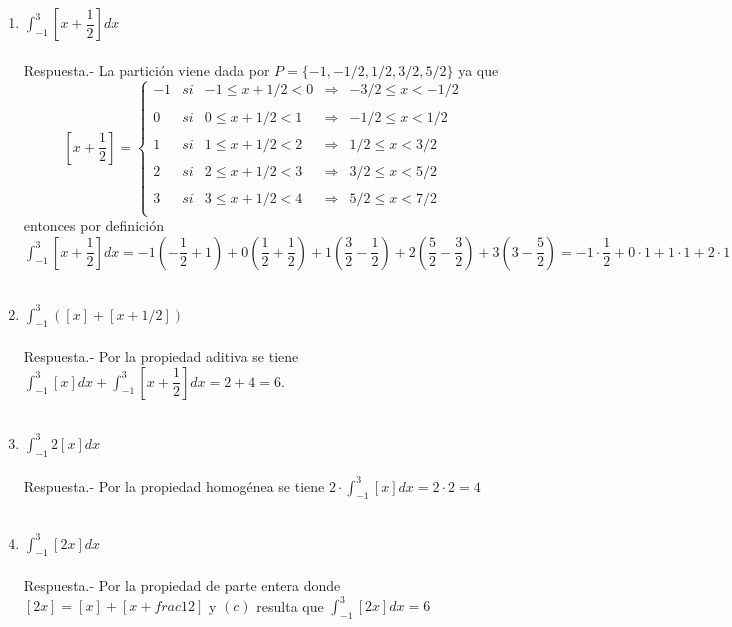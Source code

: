\begin{enumerate}
\begin{enumerate}[\bfseries (a)]
	\item $\displaystyle\int_{-1}^{3} \left[ x + \dfrac{1}{2} \right] dx$\\\\
	    Respuesta.-\; La partición viene dada por $P=\lbrace -1,-1/2,1/2,3/2,5/2\rbrace$ ya que 
	    $$\left[x + \dfrac{1}{2} \right] = \left\{ \begin{array}{rclcl}
		-1&si&-1\leq x + 1/2 < 0&\Longrightarrow&-3/2 \leq x < -1/2\\
		\\ 0&si&0\leq x + 1/2 < 1&\Longrightarrow&-1/2 \leq x < 1/2\\
		\\ 1&si&1\leq x + 1/2 < 2&\Longrightarrow&1/2 \leq x < 3/2\\
		\\ 2&si&2 \leq x + 1/2 < 3&\Longrightarrow&3/2 \leq x < 5/2\\
		\\ 3&si &3 \leq x + 1/2 < 4&\Longrightarrow&5/2 \leq x < 7/2 \\
	    \end{array}\right.$$
	     entonces por definición $\displaystyle\int_{-1}^{3} \left[x + \dfrac{1}{2}\right] dx = -1\left(-\dfrac{1}{2} + 1\right) + 0 \left( \dfrac{1}{2} + \dfrac{1}{2}\right) + 1\left(\dfrac{3}{2} - \dfrac{1}{2}\right) + 2\left( \dfrac{5}{2} - \dfrac{3}{2}\right) + 3\left( 3 - \dfrac{5}{2}\right) = -1\cdot \dfrac{1}{2} + 0\cdot 1 + 1\cdot 1 + 2\cdot 1 + 3\cdot \dfrac{1}{2} = 4$\\\\
	 \item $\displaystyle\int_{-1}^{3} \left([x] + [x + 1/2]\right)$\\\\
	     Respuesta.-\; Por la propiedad aditiva se tiene $\displaystyle\int_{-1}^{3} [x] dx + \int_{-1}^{3} \left[x + \dfrac{1}{2}\right] dx = 2+4=6$.\\\\  

	\item $\displaystyle\int_{-1}^{3} 2[x] dx$\\\\
	    Respuesta.-\; Por la propiedad homogénea se tiene $2\cdot \displaystyle\int_{-1}^{3} [x] dx = 2\cdot 2 = 4$\\\\

	\item $\displaystyle\int_{-1}^{3} [2x] dx$\\\\
	    Respuesta.-\; Por la propiedad de parte entera donde $[2x] = [x] + [x + frac{1}{2}]$ y $(c)$ resulta que $\displaystyle\int_{-1}^{3} [2x] dx = 6$\\\\


\end{enumerate}
\end{enumerate}
